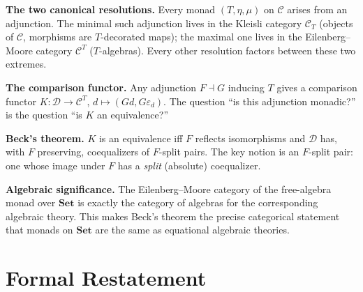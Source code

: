 \begin{summarybox}
\textbf{The two canonical resolutions.}\quad
Every monad $(T,\eta,\mu)$ on $\mathcal{C}$ arises from an adjunction.
The minimal such adjunction lives in the Kleisli category $\mathcal{C}_T$
(objects of $\mathcal{C}$, morphisms are $T$-decorated maps); the maximal
one lives in the Eilenberg--Moore category $\mathcal{C}^T$ ($T$-algebras).
Every other resolution factors between these two extremes.

\textbf{The comparison functor.}\quad
Any adjunction $F \dashv G$ inducing $T$ gives a comparison functor
$K: \mathcal{D} \to \mathcal{C}^T$, $d \mapsto (Gd, G\varepsilon_d)$.
The question ``is this adjunction monadic?'' is the question ``is $K$ an
equivalence?''

\textbf{Beck's theorem.}\quad
$K$ is an equivalence iff $F$ reflects isomorphisms and $\mathcal{D}$
has, with $F$ preserving, coequalizers of $F$-split pairs. The key notion
is an $F$-split pair: one whose image under $F$ has a \emph{split}
(absolute) coequalizer.

\textbf{Algebraic significance.}\quad
The Eilenberg--Moore category of the free-algebra monad over $\mathbf{Set}$
is exactly the category of algebras for the corresponding algebraic theory.
This makes Beck's theorem the precise categorical statement that monads on
$\mathbf{Set}$ are the same as equational algebraic theories.
\end{summarybox}


\section{Formal Restatement}
\label{sec:monads-beck-formal}

